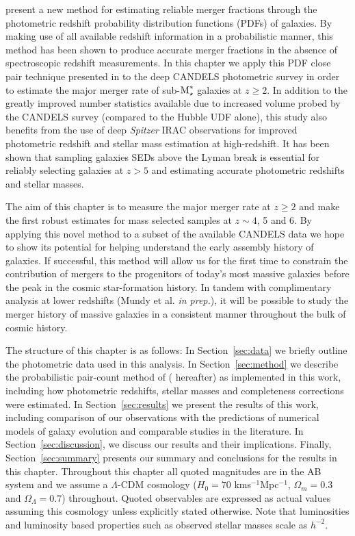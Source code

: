 \citet{LopezSanjuan:2014uj} present a new method for estimating reliable merger fractions through the photometric redshift probability distribution functions (PDFs) of galaxies. By making use of all available redshift information in a probabilistic manner, this method has been shown to produce accurate merger fractions in the absence of spectroscopic redshift measurements. In this chapter we apply this PDF close pair technique presented in \citet{LopezSanjuan:2014uj} to the deep CANDELS \citep{2011ApJS..197...35G,Koekemoer:2011br} photometric survey in order to estimate the major merger rate of sub-$\text{M}_{\star}^{*}$ galaxies at $z \geq 2$. In addition to the greatly improved number statistics available due to increased volume probed by the CANDELS survey (compared to the Hubble UDF alone), this study also benefits from the use of deep \emph{Spitzer} IRAC observations for improved photometric redshift and stellar mass estimation at high-redshift. It has been shown that sampling galaxies SEDs above the Lyman break is essential for reliably selecting galaxies at $z >5$ \citep{2011MNRAS.418.2074M} and estimating accurate photometric redshifts and stellar masses. 

The aim of this chapter is to measure the major merger rate at $z \geq 2$ and make the first robust estimates for mass selected samples at $z\sim4$, 5 and 6.  By applying this novel method to a subset of the available CANDELS data we hope to show its potential for helping understand the early assembly history of galaxies. If successful, this method will allow us for the first time to constrain the contribution of mergers to the progenitors of today's most massive galaxies before the peak in the cosmic star-formation history. In tandem with complimentary analysis at lower redshifts (Mundy et al. \emph{in prep.}), it will be possible to study the merger history of massive galaxies in a consistent manner throughout the bulk of cosmic history.

The structure of this chapter is as follows: In Section~\ref{sec:data} we briefly outline the photometric data used in this analysis. In Section~\ref{sec:method} we describe the probabilistic pair-count method of \citet{LopezSanjuan:2014uj} ( hereafter) as implemented in this work, including how photometric redshifts, stellar masses and completeness corrections were estimated. In Section~\ref{sec:results} we present the results of this work, including comparison of our observations with the predictions of numerical models of galaxy evolution and comparable studies in the literature. In Section~\ref{sec:discussion}, we discuss our results and their implications. Finally, Section~\ref{sec:summary} presents our summary and conclusions for the results in this chapter. 
Throughout this chapter all quoted magnitudes are in the AB system \citep{1983ApJ...266..713O} and we assume a $\Lambda$-CDM cosmology ($H_{0} = 70$ kms$^{-1}$Mpc$^{-1}$, $\Omega_{m}=0.3$ and $\Omega_{\Lambda}=0.7$) throughout. Quoted observables are expressed as actual values assuming this cosmology unless explicitly stated otherwise. Note that luminosities and luminosity based properties such as observed stellar masses scale as $h^{-2}$.

